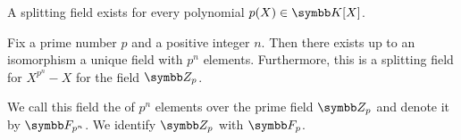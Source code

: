 \begin{proposition}\label{thm:splitting_field_existence}\cite[theorem 9.12]{Knapp2016BAlg}
  A splitting field exists for every polynomial \( p(X) \in \BK[X] \).
\end{proposition}

\begin{theorem}\label{thm:galois_field_existence}\cite[theorem 9.14]{Knapp2016BAlg}
  Fix a prime number \( p \) and a positive integer \( n \). Then there exists up to an isomorphism a unique field with \( p^n \) elements. Furthermore, this is a splitting field for \( X^{p^n} - X \) for the field \( \BZ_p \).

  We call this field the  of \( p^n \) elements over the prime field \( \BZ_p \) and denote it by
  \( \BF_{p^n} \). We identify \( \BZ_p \) with \( \BF_p \).
\end{theorem}

